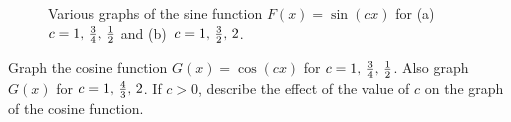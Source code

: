 \documentclass[a4paper,oneside,12pt]{article}
\begin{document}
\begin{figure}[!htbp]
\centering
{}
\caption{%
  Various graphs of the sine function $F(x) = \sin(cx)$ for
  (a)~$c = {1},\, {\frac{3}{4}},\, {\frac{1}{2}}$ and
  (b)~$c = {1},\, {\frac{3}{2}},\, {2}$.
}
\label{fig:trigonometric:sine_horizontal_stretch_compress}
\end{figure}

\begin{exercise}
Graph the cosine function $G(x) = \cos(cx)$ for
$c = {1},\, {\frac{3}{4}},\, {\frac{1}{2}}$.  Also graph $G(x)$ for
$c = {1},\, {\frac{4}{3}},\, {2}$.  If $c > 0$, describe the effect of
the value of $c$ on the graph of the cosine function.
\end{exercise}
\end{document}
